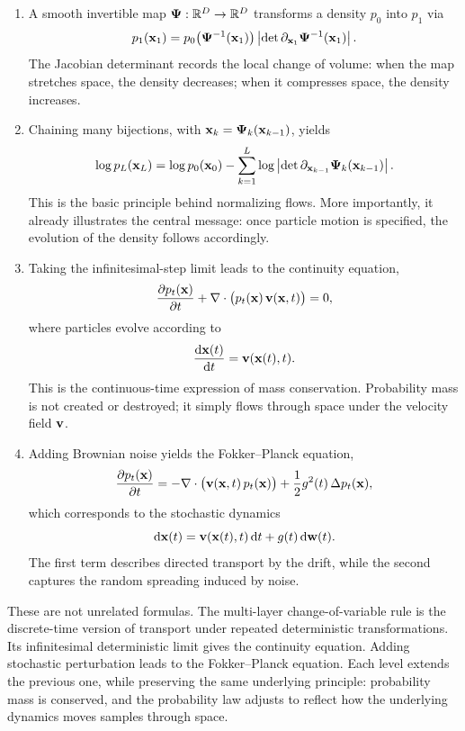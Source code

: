 \begin{enumerate}[leftmargin=2em]
    \item {}
    A smooth invertible map ${\bm{\Psi}}:\mathbb{R}^D\to\mathbb{R}^D$ transforms a density $p_0$ into $p_1$ via
    \[
    p_1({\mathbf{x}}_1)
    =
    p_0\bigl({\bm{\Psi}}^{-1}({\mathbf{x}}_1)\bigr)
    \left|\det \partial_{{\mathbf{x}}_1}{\bm{\Psi}}^{-1}({\mathbf{x}}_1)\right|.
    \]
    The Jacobian determinant records the local change of volume: when the map stretches space, the density decreases; when it compresses space, the density increases.

    \item {}
    Chaining many bijections, with ${\mathbf{x}}_k={\bm{\Psi}}_k({\mathbf{x}}_{k-1})$, yields
    \[
    \log p_L({\mathbf{x}}_L)
    =
    \log p_0({\mathbf{x}}_0)
    -
    \sum_{k=1}^L
    \log\left|\det \partial_{{\mathbf{x}}_{k-1}}{\bm{\Psi}}_k({\mathbf{x}}_{k-1})\right|.
    \]
    This is the basic principle behind normalizing flows. More importantly, it already illustrates the central message: once particle motion is specified, the evolution of the density follows accordingly.

    \item {}
    Taking the infinitesimal-step limit leads to the continuity equation,
    \[
    \frac{\partial p_t({\mathbf{x}})}{\partial t}
    +
    \nabla\cdot\bigl(p_t({\mathbf{x}})\,{\mathbf{v}}({\mathbf{x}},t)\bigr)
    =
    0,
    \]
    where particles evolve according to
    \[
    \frac{\mathop{}\!\mathrm{d} {\mathbf{x}}(t)}{\mathop{}\!\mathrm{d} t} = {\mathbf{v}}({\mathbf{x}}(t),t).
    \]
    This is the continuous-time expression of mass conservation. Probability mass is not created or destroyed; it simply flows through space under the velocity field ${\mathbf{v}}$.

    \item {}
    Adding Brownian noise yields the Fokker--Planck equation,
    \[
    \frac{\partial p_t({\mathbf{x}})}{\partial t}
    =
    -\nabla\cdot\bigl({\mathbf{v}}({\mathbf{x}},t)\,p_t({\mathbf{x}})\bigr)
    +
    \frac{1}{2}g^2(t)\,\Delta p_t({\mathbf{x}}),
    \]
    which corresponds to the stochastic dynamics
    \[
    \mathop{}\!\mathrm{d}{\mathbf{x}}(t) = {\mathbf{v}}({\mathbf{x}}(t),t)\mathop{}\!\mathrm{d} t + g(t)\mathop{}\!\mathrm{d}{\mathbf{w}}(t).
    \]
    The first term describes directed transport by the drift, while the second captures the random spreading induced by noise.
\end{enumerate}

These are not unrelated formulas.
The multi-layer change-of-variable rule is the discrete-time version of transport under repeated deterministic transformations.
Its infinitesimal deterministic limit gives the continuity equation.
Adding stochastic perturbation leads to the Fokker--Planck equation.
Each level extends the previous one, while preserving the same underlying principle: probability mass is conserved, and the probability law adjusts to reflect how the underlying dynamics moves samples through space.

